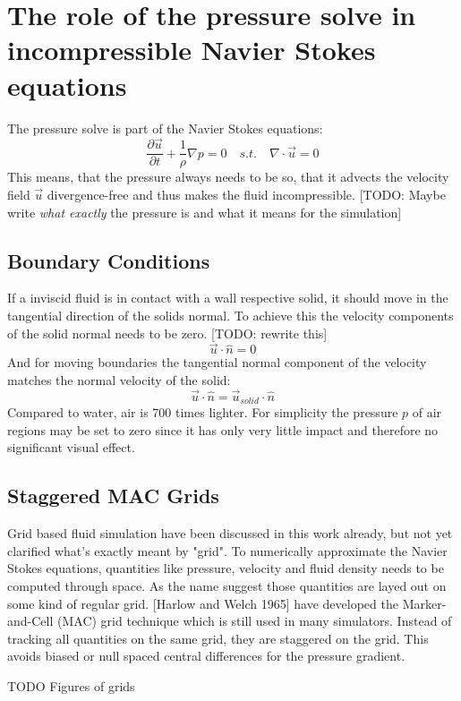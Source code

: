 \section{The role of the pressure solve in incompressible Navier Stokes equations}
The pressure solve is part of the Navier Stokes equations:
\begin{equation} \label{navier-stokes-pressure}
	\frac{\partial \vec{u}}{\partial t} + \frac{1}{\rho}  \nabla p = 0 \quad s.t. \quad \nabla \cdot \vec{u} = 0
\end{equation}
This means, that the pressure always needs to be so, that it advects the velocity field $\vec{u}$ divergence-free and thus makes the fluid incompressible.  [TODO: Maybe write \textit{what exactly} the pressure is and what it means for the simulation]

\subsection{Boundary Conditions}
If a inviscid fluid is in contact with a wall respective solid, it should move in the tangential direction of the solids normal. To achieve this the velocity components of the solid normal needs to be zero. [TODO: rewrite this]
\begin{equation} \label{navier-stokes12}
	\vec{u} \cdot \hat{n} = 0
\end{equation}
And for moving boundaries the tangential normal component of the velocity matches the normal velocity of the solid:
\begin{equation} \label{navier-stokes12}
	\vec{u} \cdot \hat{n} = \vec{u}_{solid} \cdot \hat{n}
\end{equation}
Compared to water, air is 700 times lighter. For simplicity the pressure $p$ of air regions may be set to zero since it has only very little impact and therefore no significant visual effect.

\subsection{Staggered MAC Grids}
Grid based fluid simulation have been discussed in this work already, but not yet clarified what's exactly meant by "grid". To numerically approximate the Navier Stokes equations, quantities like pressure, velocity and fluid density needs to be computed through space. As the name suggest those quantities are layed out on some kind of regular grid. [Harlow and Welch 1965] have developed the Marker-and-Cell (MAC) grid technique which is still used in many simulators. Instead of tracking all quantities on the same grid, they are staggered on the grid. This avoids biased or null spaced central differences for the pressure gradient. 
\par TODO Figures of grids 


